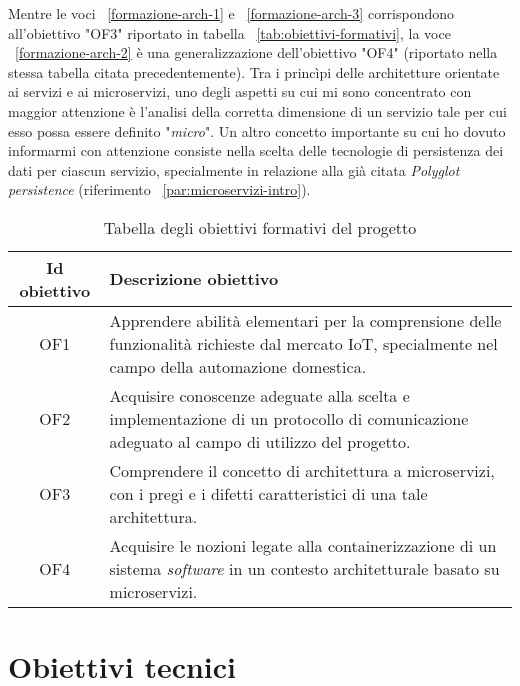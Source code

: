 \smallskip
Mentre le voci ~\ref{formazione-arch-1} e ~\ref{formazione-arch-3} corrispondono all'obiettivo "OF3" riportato in tabella ~\ref{tab:obiettivi-formativi}, la voce ~\ref{formazione-arch-2} è una generalizzazione dell'obiettivo "OF4" (riportato nella stessa tabella citata precedentemente).
Tra i princìpi delle architetture orientate ai servizi e ai microservizi, uno degli aspetti su cui mi sono concentrato con maggior attenzione è l'analisi della corretta dimensione di un servizio tale per cui esso possa essere definito "\emph{micro}".
Un altro concetto importante su cui ho dovuto informarmi con attenzione consiste nella scelta delle tecnologie di persistenza dei dati per ciascun servizio, specialmente in relazione alla già citata \emph{Polyglot persistence} (riferimento ~\ref{par:microservizi-intro}).

\begin{table}[H]
\caption{Tabella degli obiettivi formativi del progetto}
\label{tab:obiettivi-formativi}
\begin{tabularx}{\linewidth}{|c|X|}
\hline
\textbf{Id obiettivo} & \textbf{Descrizione obiettivo} \\
\hline
\label{OF1} OF1 & Apprendere abilità elementari per la comprensione delle funzionalità richieste dal mercato IoT, specialmente nel campo della automazione domestica. \\
\hline
\label{OF2} OF2 & Acquisire conoscenze adeguate alla scelta e implementazione di un protocollo di comunicazione adeguato al campo di utilizzo del progetto. \\
\hline
\label{OF3} OF3 & Comprendere il concetto di architettura a microservizi, con i pregi e i difetti caratteristici di una tale architettura. \\
\hline
\label{OF4} OF4 & Acquisire le nozioni legate alla containerizzazione di un sistema \emph{software} in un contesto architetturale basato su microservizi. \\
\hline
\end{tabularx}
\end{table}

\section{Obiettivi tecnici}

